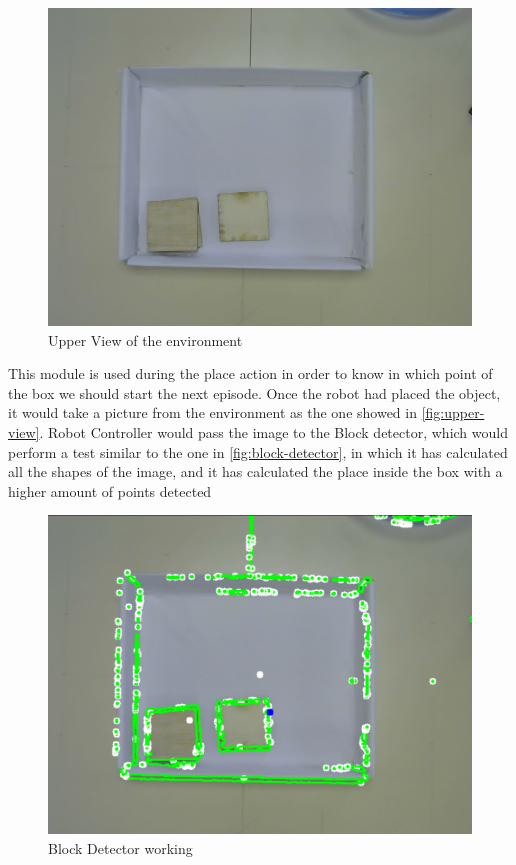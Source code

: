 			\begin{figure}[H]
				\centering
				\includegraphics[width=0.9\linewidth]{"Images/upper view"}
				\caption[Upper View]{Upper View of the environment}
				\label{fig:upper-view}
			\end{figure}
			
			This module is used during the place action in order to know in which point of the box we should start the next episode. Once the robot had placed the object, it would take a picture from the environment as the one showed in \autoref{fig:upper-view}. Robot Controller would pass the image to the Block detector, which would perform a test similar to the one in \autoref{fig:block-detector}, in which it has calculated all the shapes of the image, and it has calculated the place inside the box with a higher amount of points detected
			
			\begin{figure}[H]
				\centering
				\includegraphics[width=0.9\linewidth]{"Images/Block Detector"}
				\caption[Block Detector]{Block Detector working}
				\label{fig:block-detector}
			\end{figure}
		
